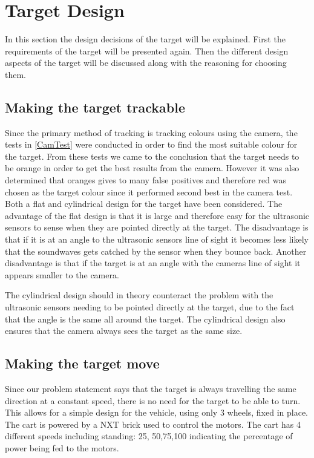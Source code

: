 \section{Target Design}\label{targetDesign}
In this section the design decisions of the target will be explained. First the
requirements of the target will be presented again. Then the different design
aspects of the target will be discussed along with the reasoning for choosing them.

\subsection{Making the target trackable}
Since the primary method of tracking is tracking colours using the camera, the
tests in \autoref{CamTest} were conducted in order to find the most suitable
colour for the target. From these tests we came to the conclusion that the target
needs to be orange in order to get the best results from the camera. However it
was also determined that oranges gives to many false positives and therefore red
was chosen as the target colour since it performed second best in the camera test.
\nl
Both a flat and cylindrical design for the target have been considered. The
advantage of the flat design is that it is large and therefore easy for the ultrasonic
sensors to sense when they are pointed directly at the target. The disadvantage
is that if it is at an angle to the ultrasonic sensors line of sight it
becomes less likely that the soundwaves gets catched by the sensor when they
bounce back. Another disadvantage is that if the target is at an angle with the
cameras line of sight it appears smaller to the camera.\nl

The cylindrical design should in theory counteract the problem with the
ultrasonic sensors needing to be pointed directly at the target, due to the
fact that the angle is the same all around the target. The cylindrical design
also ensures that the camera always sees the target as the same size.\nl

\subsection{Making the target move}
Since our problem statement says that the target is always travelling the same direction
at a constant speed, there is no need for the target to be able to turn. This allows
for a simple design for the vehicle, using only 3 wheels, fixed in place. The cart
is powered by a NXT brick used to control the motors. The cart has 4 different speeds including standing:
25, 50,75,100 indicating the percentage of power being fed to the motors. \nl

